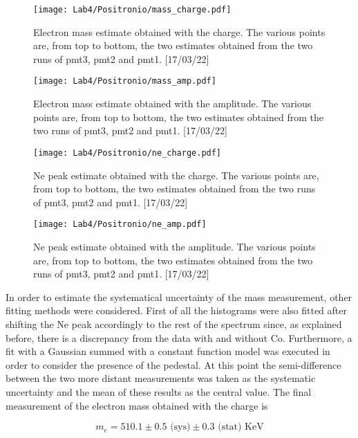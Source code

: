 \documentclass[10pt,a4paper,twocolumn]{article}
\begin{document}
\begin{figure}[h!]
\centering
\texttt{[image: Lab4/Positronio/mass\_charge.pdf]}
\caption{Electron mass estimate obtained with the charge. The various points are, from top to bottom, the two estimates obtained from the two runs of pmt3, pmt2 and pmt1. [17/03/22]}
\label{fig:realtimecalibquadmass_charge}
\end{figure}

\begin{figure}[h!]
\centering
\texttt{[image: Lab4/Positronio/mass\_amp.pdf]}
\caption{Electron mass estimate obtained with the amplitude. The various points are, from top to bottom, the two estimates obtained from the two runs of pmt3, pmt2 and pmt1. [17/03/22]}
\label{fig:realtimecalibquadmass_amp}
\end{figure}

\begin{figure}[h!]
\centering
\texttt{[image: Lab4/Positronio/ne\_charge.pdf]}
\caption{Ne peak estimate obtained with the charge. The various points are, from top to bottom, the two estimates obtained from the two runs of pmt3, pmt2 and pmt1. [17/03/22]}
\label{fig:realtimecalibquad_ne_charge}
\end{figure}

\begin{figure}[h!]
\centering
\texttt{[image: Lab4/Positronio/ne\_amp.pdf]}
\caption{Ne peak estimate obtained with the amplitude. The various points are, from top to bottom, the two estimates obtained from the two runs of pmt3, pmt2 and pmt1. [17/03/22]}
\label{fig:realtimecalibquad_ne_amp}
\end{figure}

In order to estimate the systematical uncertainty of the mass measurement, other fitting methods were considered. First of all the histograms were also fitted after shifting the Ne peak accordingly to the rest of the spectrum since, as explained before, there is a discrepancy from the data with and without Co. Furthermore, a fit with a Gaussian summed with a constant function model was executed in order to consider the presence of the pedestal. At this point the semi-difference between the two more distant measurements was taken as the systematic uncertainty and the mean of these results as the central value. The final measurement of the electron mass obtained with the charge is 

\begin{equation}
    m_e=510.1 \pm 0.5 \text{ (sys)} \pm 0.3 \text{ (stat) KeV} 
\end{equation}
\end{document}
